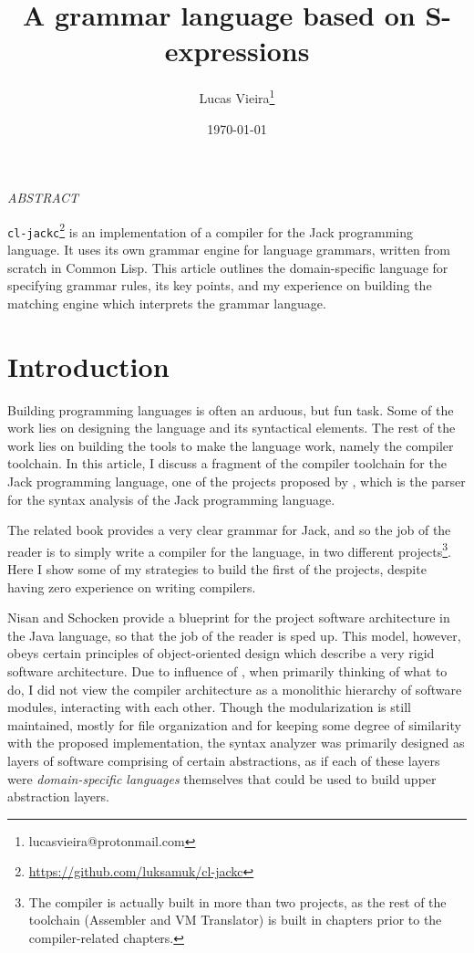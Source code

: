 \documentclass[a4paper,11pt,oneside]{article}
\author{Lucas Vieira\thanks{lucasvieira@protonmail.com}}
\date{\today}
\title{A grammar language based on S-expressions}
\begin{document}
\maketitle
\begin{center}
\emph{ABSTRACT}
\end{center}

\par\noindent
\texttt{cl-jackc}\footnote{\url{https://github.com/luksamuk/cl-jackc}} is an implementation of a compiler for the Jack
programming language. It uses its own grammar engine for language
grammars, written from scratch in Common Lisp. This article outlines
the domain-specific language for specifying grammar rules, its key
points, and my experience on building the matching engine which
interprets the grammar language.


\section{Introduction}
\label{sec:org216dbda}

Building programming languages is often an arduous, but fun task. Some
of the work lies on designing the language and its syntactical
elements. The rest of the work lies on building the tools
to make the language work, namely the compiler toolchain. In this
article, I discuss a fragment of the compiler toolchain for the Jack
programming language, one of the projects proposed by
\cite{nand2tetris}, which is the parser for the syntax analysis of the
Jack programming language.

The related book provides a very clear grammar for Jack, and so the
job of the reader is to simply write a compiler for the language, in
two different projects\footnote{The compiler is actually built in more than two projects, as
the rest of the toolchain (Assembler and VM Translator) is built in
chapters prior to the compiler-related chapters.}. Here I show some of my strategies to
build the first of the projects, despite having zero experience on
writing compilers.

Nisan and Schocken \cite{nand2tetris} provide a blueprint for the
project software architecture in the Java language, so that the job of
the reader is sped up. This model, however, obeys certain principles
of object-oriented design which describe a very rigid software
architecture. Due to influence of \cite{sicp}, when primarily thinking
of what to do, I did not view the compiler architecture as a
monolithic hierarchy of software modules, interacting with each
other. Though the modularization is still maintained, mostly for file
organization and for keeping some degree of similarity with the
proposed implementation, the syntax analyzer was primarily designed as
layers of software comprising of certain abstractions, as if each of
these layers were \emph{domain-specific languages} themselves that could be
used to build upper abstraction layers.
\end{document}
